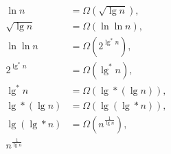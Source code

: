 \begin{align*}
	\ln n &= \Omega \left(\sqrt{\lg n} \right), \\
	\sqrt{\lg n} &= \Omega \left(\ln \ln n \right), \\
	\ln \ln n &= \Omega \left(2^{\lg ^* n} \right), \\
	2^{\lg ^* n} &= \Omega \left(\lg ^* n \right), \\
	\lg ^* n &= \Omega \left(\lg * (\lg n) \right), \\
	\lg * (\lg n) &= \Omega \left(\lg (\lg * n) \right), \\
	\lg (\lg * n) &= \Omega \left(n^{\frac{1}{\lg n}} \right), \\
	n^{\frac{1}{\lg n}}
\end{align*}

